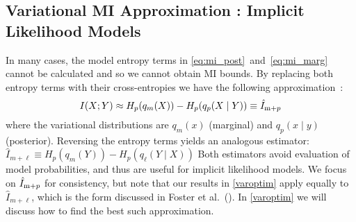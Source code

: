 \subsection{Variational MI Approximation : Implicit Likelihood Models}
In many cases, the model entropy terms in
\EQNS\eqref{eq:mi_post}~and~\eqref{eq:mi_marg} cannot be calculated 
and so we cannot obtain MI bounds.  By replacing both entropy terms with
their cross-entropies we have the following
approximation~\cite{Foster2019}:
\begin{equation}\label{eq:mi_ml}
  I(X;Y) \approx H_p( q_m(X) ) - H_p( q_p(X \mid Y) ) \equiv \hat{I}_{\text{m}+p}   
\end{equation}
where the variational distributions are $q_m(x)$ (marginal) and
$q_p(x \mid y)$ (posterior).  Reversing the entropy terms yields an
analogous estimator: \mbox{$\hat{I}_{m+\ell} \equiv H_p( q_m(Y) ) -
H_p( q_\ell( Y \mid X ) )$}
Both estimators avoid evaluation of model probabilities, and thus are
useful for implicit likelihood models.  We focus on $\hat{I}_{\text{m}+p}$ for
consistency, but note that our results in \SEC\ref{varoptim} apply
equally to $\hat{I}_{m+\ell}$, which is the form discussed in Foster
et al.~(\citeyear{Foster2019}).  In \SEC\ref{varoptim} we will discuss
how to find the best such approximation.





